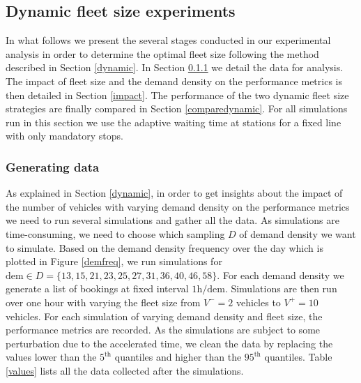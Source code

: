 \documentclass[12pt,a4paper]{article}
\begin{document}
\subsection{Dynamic fleet size experiments}\label{dynamicexperiments}
In what follows we present the several stages conducted in our experimental analysis in order to determine the optimal fleet size following the method described in Section \ref{dynamic}. In Section \ref{data} we detail the data for analysis. The impact of fleet size and the demand density on the performance metrics is then detailed in Section \ref{impact}. The performance of the two dynamic fleet size strategies are finally compared in Section \ref{comparedynamic}. For all simulations run in this section we use the adaptive waiting time at stations for a fixed line with only mandatory stops. 

\subsubsection{Generating data}\label{data}
As explained in Section \ref{dynamic}, in order to get insights about the impact of the number of vehicles with varying demand density on the performance metrics we need to run several simulations and gather all the data. As simulations are time-consuming, we need to choose which sampling $D$ of demand density we want to simulate. Based on the demand density frequency over the day which is plotted in Figure \ref{demfreq}, we run simulations for $\text{dem} \in D = \{13, 15, 21, 23, 25, 27, 31, 36, 40, 46, 58\}$. For each demand density we generate a list of bookings at fixed interval $1\text{h} / \text{dem}$. Simulations are then run over one hour with varying the fleet size from $V^{-}=2$ vehicles to $V^{+}=10$ vehicles. For each simulation of varying demand density and fleet size, the performance metrics are recorded. As the simulations are subject to some perturbation due to the accelerated time, we clean the data by replacing the values lower than the $5^{\text{th}}$ quantiles and higher than the $95^{\text{th}}$ quantiles. Table \ref{values} lists all the data collected after the simulations.
\end{document}
